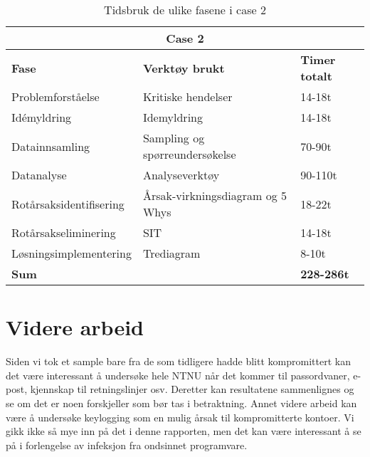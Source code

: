 \begin{table}[H]
  \centering
  \caption{Tidsbruk de ulike fasene i case 2}
    \begin{tabular}{|lr|l|}
    \hline
    \multicolumn{3}{|c|}{\cellcolor{yellow}\textbf{Case 2}} \\
    \hline
    \multicolumn{1}{|l|}{\cellcolor{apricot}\textbf{Fase}} & \multicolumn{1}{l|}{\cellcolor{apricot}\textbf{Verktøy brukt}} & \cellcolor{apricot}\textbf{Timer totalt} \\
    \hline
    \multicolumn{1}{|l|}{Problemforståelse} & \multicolumn{1}{l|}{Kritiske hendelser} & 14-18t \\
    \hline
    \multicolumn{1}{|l|}{Idémyldring} & \multicolumn{1}{l|}{Idemyldring} & 14-18t \\
    \hline
    \multicolumn{1}{|l|}{Datainnsamling} & \multicolumn{1}{l|}{Sampling og spørreundersøkelse} & 70-90t \\
    \hline
    \multicolumn{1}{|l|}{Datanalyse} & \multicolumn{1}{l|}{Analyseverktøy} & 90-110t \\
    \hline
    \multicolumn{1}{|l|}{Rotårsaksidentifisering} & \multicolumn{1}{l|}{Årsak-virkningsdiagram og 5 Whys} & 18-22t \\
    \hline
    \multicolumn{1}{|l|}{Rotårsakseliminering} & \multicolumn{1}{l|}{SIT} & 14-18t \\
    \hline
    \multicolumn{1}{|l|}{Løsningsimplementering} & \multicolumn{1}{l|}{Trediagram} & 8-10t \\
    \hline
    \multicolumn{2}{|l|}{\textbf{Sum}} & \textbf{228-286t} \\
    \hline
    \end{tabular}%
  \label{tab:tidsbruk_case2}%
\end{table}%


\section{Videre arbeid}
Siden vi tok et sample bare fra de som tidligere hadde blitt kompromittert kan det være interessant å undersøke hele NTNU når det kommer til passordvaner, e-post, kjennskap til retningslinjer osv. Deretter kan resultatene sammenlignes og se om det er noen forskjeller som bør tas i betraktning. Annet videre arbeid kan være å undersøke keylogging som en mulig årsak til kompromitterte kontoer. Vi gikk ikke så mye inn på det i denne rapporten, men det kan være interessant å se på i forlengelse av infeksjon fra ondsinnet programvare. 